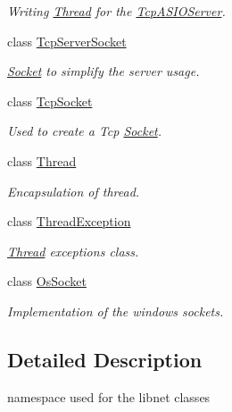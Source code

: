 \begin{DoxyCompactItemize}
\begin{DoxyCompactList}\small\item\em Writing \hyperlink{classmognetwork_1_1_thread}{Thread} for the \hyperlink{classmognetwork_1_1_tcp_a_s_i_o_server}{Tcp\-A\-S\-I\-O\-Server}. \end{DoxyCompactList}\item 
class \hyperlink{classmognetwork_1_1_tcp_server_socket}{Tcp\-Server\-Socket}
\begin{DoxyCompactList}\small\item\em \hyperlink{classmognetwork_1_1_socket}{Socket} to simplify the server usage. \end{DoxyCompactList}\item 
class \hyperlink{classmognetwork_1_1_tcp_socket}{Tcp\-Socket}
\begin{DoxyCompactList}\small\item\em Used to create a Tcp \hyperlink{classmognetwork_1_1_socket}{Socket}. \end{DoxyCompactList}\item 
class \hyperlink{classmognetwork_1_1_thread}{Thread}
\begin{DoxyCompactList}\small\item\em Encapsulation of thread. \end{DoxyCompactList}\item 
class \hyperlink{classmognetwork_1_1_thread_exception}{Thread\-Exception}
\begin{DoxyCompactList}\small\item\em \hyperlink{classmognetwork_1_1_thread}{Thread} exceptions class. \end{DoxyCompactList}\item 
class \hyperlink{classmognetwork_1_1_os_socket}{Os\-Socket}
\begin{DoxyCompactList}\small\item\em Implementation of the windows sockets. \end{DoxyCompactList}\end{DoxyCompactItemize}


\subsection{Detailed Description}
namespace used for the libnet classes 